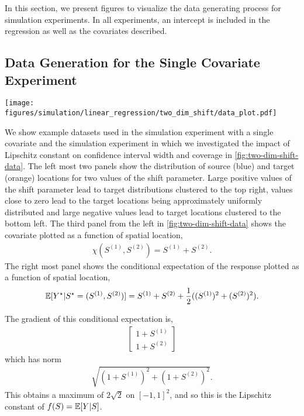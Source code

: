 In this section, we present figures to visualize the data generating process for simulation experiments. In all experiments, an intercept is included in the regression as well as the covariates described.

\subsection{Data Generation for the Single Covariate Experiment}

\begin{figure*}
    \centering
    \texttt{[image: figures/simulation/linear\_regression/two\_dim\_shift/data\_plot.pdf]}
    \caption{Spatial sites for the source (blue) and target (orange) data are shown in the left most plots for different values of shift used in generating the data. More extreme values of the shift parameter lead to larger biases in parameter estimation from the training data without adjustment. The third plot from the left shows the covariate surface, while the fourth shows the expected response at each spatial location.}
    \label{fig:two-dim-shift-data}
\end{figure*}

We show example datasets used in the simulation experiment with a single covariate and the simulation experiment in which we investigated the impact of Lipschitz constant on confidence interval width and coverage in \cref{fig:two-dim-shift-data}. The left most two panels show the distribution of source (blue) and target (orange) locations for two values of the shift parameter. Large positive values of the shift parameter lead to target distributions clustered to the top right, values close to zero lead to the target locations being approximately uniformly distributed and large negative values lead to target locations clustered to the bottom left. The third panel from the left in \cref{fig:two-dim-shift-data} shows the covariate plotted as a function of spatial location,
\begin{align}
    \chi(S^{(1)},S^{(2)}) = S^{(1)}+S^{(2)}.
\end{align}
The right most panel shows the conditional expectation of the response plotted as a function of spatial location,
\begin{align}
    \mathbb{E}[Y^{\star}|S^{\star} = (S^{(1)},S^{(2)})] = S^{(1)}+ S^{(2)} + \frac{1}{2}((S^{(1)})^2+(S^{(2)})^2).
\end{align}

The gradient of this conditional expectation is,
\begin{align}
    \begin{bmatrix}
    1 + S^{(1)} \\
    1+ S^{(2)}
    \end{bmatrix}
\end{align}
which has norm
\begin{align}
    \sqrt{(1 + S^{(1)})^2 + (1+ S^{(2)})^2}. 
\end{align}
This obtains a maximum of $2\sqrt{2}$ on $[-1,1]^2$, and so this is the Lipschitz constant of $f(S) = \mathbb{E}[Y|S]$.


